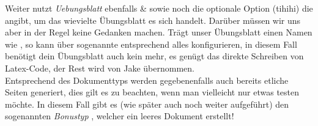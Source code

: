 Weiter nutzt \emph{Uebungsblatt} ebenfalls \& sowie noch die optionale Option (tihihi)  die angibt, um das wievielte Übungsblatt es sich handelt. Darüber müssen wir uns aber in der Regel keine Gedanken machen. Trägt unser Übungsblatt einen Namen wie , so kann \Jake über sogenannte  entsprechend alles konfigurieren, in diesem Fall benötigt dein Übungsblatt auch kein  mehr, es genügt das direkte Schreiben von Latex-Code, der Rest wird von Jake übernommen.\\
Entsprechend des Dokumenttyps werden gegebenenfalls auch bereits etliche Seiten generiert, dies gilt es zu beachten, wenn man vielleicht nur etwas testen möchte. In diesem Fall gibt es (wie später auch noch weiter aufgeführt) den sogenannten \emph{Bonustyp} , welcher ein leeres Dokument erstellt! %
\clearpage
